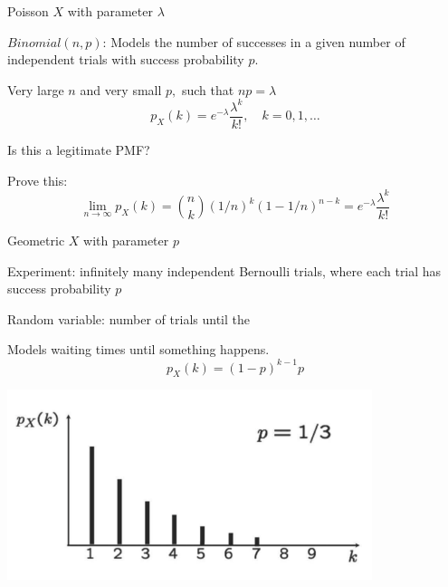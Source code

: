 \documentclass[fleqn,aspectratio=169]{beamer}
\begin{document}
\begin{frame}{Poisson $X$ with parameter $\lambda$}


\plitemsep 0.05in
\bci 
\item<2-> $Binomial(n,p)$: Models the number of successes in a given number of independent trials with success probability $p.$

\item<3-> Very large $n$ and very small $p,$ such that $np =\lambda$
$$
p_X(k) = e^{-\lambda}\frac{\lambda^k}{k!}, \quad k=0,1, \ldots
$$

\item<4-> Is this a legitimate PMF?

\item<5-> Prove this:
$$
\lim_{n \rightarrow \infty} p_X(k) = {n \choose k} (1/n)^k (1-1/n)^{n-k} = e^{-\lambda}\frac{\lambda^k}{k!}
$$


\eci 

\end{frame}

\begin{frame}{Geometric $X$ with parameter $p$}

{
\plitemsep 0.1in
\bci 
\item<1-> Experiment: infinitely many independent Bernoulli trials, where each trial has success probability $p$

\item<2-> Random variable: number of trials until the  

\item<3-> Models waiting times until something happens. 
$$
p_X(k) =  (1-p)^{k-1} p
$$
\eci 
}
{
\centering
\includegraphics[width=0.8\textwidth]{L3_geo_ex.png}
}
\end{frame}
\end{document}
